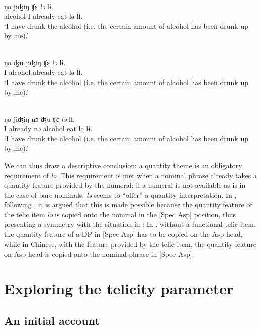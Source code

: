 \documentclass[output=paper]{langsci/langscibook}
\begin{document}
\begin{exe}
    \ex {}\\
      ŋo {jiʤiŋ} {ʧε} \emph{lə} lɨ. \\
    alcohol I already eat lə lɨ. \\
    \glt \enquote*{I have drunk the alcohol (i.e. the certain amount of alcohol has been drunk up by me).}

    \ex {}\\
  \gll ŋo ʤu {jiʤiŋ} {ʧε} \emph{lə} lɨ. \\
    I alcohol already eat lə lɨ. \\
    \glt \enquote*{I have drunk the alcohol (i.e. the certain amount of alcohol has been drunk up by me).}

\ex {}\\
   \gll ŋo {jiʤiŋ} {nɔ} ʤu {ʧε} \emph{lə} lɨ. \\
    I already {nɔ} alcohol eat lə lɨ. \\
    \glt \enquote*{I have drunk the alcohol (i.e. the certain amount of alcohol has been drunk up by me).}
\end{exe}

We can thus draw a descriptive conclusion: a quantity theme is an obligatory
requirement of \emph{lə}. This requirement is met when a nominal phrase already
takes a quantity feature provided by the numeral; if a numeral is not available
as is in the case of bare nominals, \emph{lə} seems to ``offer'' a quantity
interpretation. In \textcite{Huxuhui2016}, following \textcite{Borer2005b}, it
is argued that this is made possible because the quantity feature of the telic
item \emph{lə} is copied onto the nominal in the [Spec Asp] position,
thus presenting a symmetry with the situation in : In , without a
functional telic item, the quantity feature of a DP in [Spec Asp] has to
be copied on the Asp head, while in Chinese, with the feature provided
by the telic item, the quantity feature on Asp head is copied onto the
nominal phrase in [Spec Asp].

\section{Exploring the telicity parameter}\label{sec:17.5}
\subsection{An initial account}
\end{document}
